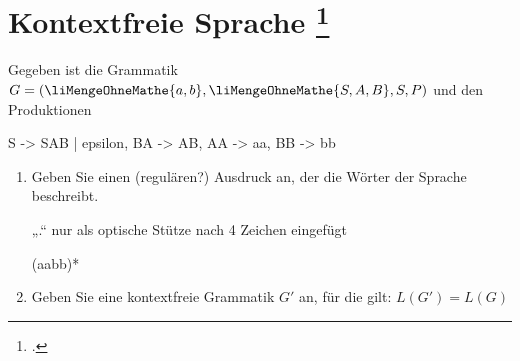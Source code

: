 \documentclass{lehramt-informatik-aufgabe}
\begin{document}
\let\m=\liMengeOhneMathe
\let\u=\liKellerUebergang
\let\z=\liZustandsnameTiefgestellt

\section{Kontextfreie Sprache
\footcite{theo:ab:2}}

Gegeben ist die Grammatik $G = (\m{a, b}, \m{S, A, B}, S, P)$ und den
Produktionen

\bigskip
\noindent
\begin{liProduktionsRegeln}
S -> SAB | epsilon,
BA -> AB,
AA -> aa,
BB -> bb
\end{liProduktionsRegeln}

\begin{enumerate}


\item Geben Sie einen (regulären?) Ausdruck an, der die Wörter der
Sprache beschreibt.

%

\begin{liAntwort}
\let\u=\liPseudoUeberschrift

„.“ nur als optische Stütze nach 4 Zeichen eingefügt

\u{4}


\u{6}


\u{8}



\u{12}



(aabb)*
\end{liAntwort}


\item Geben Sie eine kontextfreie Grammatik $G'$ an, für die gilt:
$L(G') = L(G)$


\end{enumerate}
\end{document}
